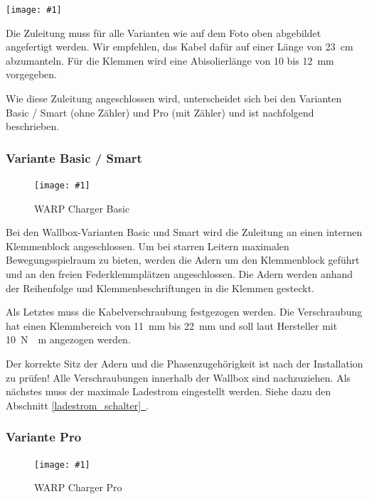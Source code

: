 \documentclass[a4paper,10pt]{article}
\newcommand{\gfx}[1]{\texttt{[image: \#1]}}
\newcommand*{\fullref}[1]{Abschnitt \hyperref[{#1}]{\ref*{#1}~\nameref*{#1}}}
\begin{document}
\begin{multicols*}{2}
    \gfx{./img_warp2/resized/warp_cable_cut_ready}

    Die Zuleitung muss für alle Varianten wie auf dem Foto oben abgebildet
    angefertigt werden. Wir empfehlen, das Kabel dafür auf einer Länge von
    \SI{23}{\centi\meter} abzumanteln. Für die Klemmen wird eine
    Abisolierlänge von 10 bis \SI{12}{\milli\meter} vorgegeben.

    Wie diese Zuleitung angeschlossen wird, unterscheidet sich bei
    den Varianten Basic / Smart (ohne Zähler) und Pro (mit Zähler) und ist
    nachfolgend beschrieben.

    \subsubsection{Variante Basic / Smart}

    \begin{figure}[H]
        \gfx{./img_warp2/resized/warp2_basic_top_open}
        \caption*{WARP Charger Basic}
    \end{figure}

    Bei den Wallbox-Varianten Basic und Smart
    wird die Zuleitung an einen internen Klemmenblock
    angeschlossen. Um bei starren Leitern maximalen Bewegungsspielraum zu bieten,
    werden die Adern um den Klemmenblock geführt und an den freien
    Federklemmplätzen angeschlossen. Die Adern werden anhand der Reihenfolge und
    Klemmenbeschriftungen in die Klemmen gesteckt.

    Als Letztes muss die Kabelverschraubung festgezogen werden. Die Verschraubung
    hat einen Klemmbereich von \SI{11}{\milli\meter} bis \SI{22}{\milli\meter} und soll laut Hersteller mit
    \SI{10}{\newton{}\meter} angezogen werden.

    Der korrekte Sitz der Adern und die Phasenzugehörigkeit ist nach der
    Installation zu prüfen! Alle Verschraubungen innerhalb der Wallbox sind nachzuziehen.
    Als nächstes muss der maximale Ladestrom eingestellt werden. Siehe dazu den
	\fullref{ladestrom_schalter}.


    \subsubsection{Variante Pro}

    \begin{figure}[H]
        \gfx{./img_warp2/resized/warp2_pro_top_open}
        \caption*{WARP Charger Pro}
    \end{figure}


\end{multicols*}
\end{document}
